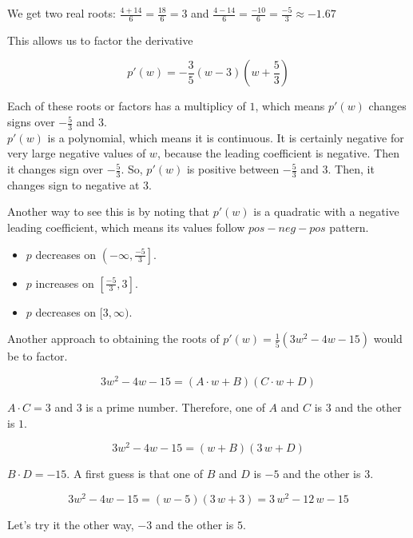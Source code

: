 \documentclass{ximera}
\begin{document}
We get two real roots: $\frac{4 + 14}{6} = \frac{18}{6} = 3$  and $\frac{4 - 14}{6} = \frac{-10}{6} = \frac{-5}{3} \approx -1.67$




This allows us to factor the derivative

\[
p'(w) = -\frac{3}{5}(w - 3) \left( w + \frac{5}{3} \right)
\]

Each of these roots or factors has a multiplicy of $1$, which means $p'(w)$ changes signs over $-\frac{5}{3}$ and $3$. \\


$p'(w)$ is a polynomial, which means it is continuous. It is certainly negative for very large negative values of $w$, because the leading coefficient is negative.  Then it changes sign over $-\frac{5}{3}$.  So, $p'(w)$ is positive between $-\frac{5}{3}$ and $3$.  Then, it changes sign to negative at $3$.


Another way to see this is by noting that $p'(w)$ is a quadratic with a negative leading coefficient, which means its values follow $pos - neg - pos$ pattern.


\begin{itemize}
\item $p$ decreases on $\left(-\infty, \frac{-5}{3}\right]$.
\item $p$ increases on $\left[\frac{-5}{3}, 3\right]$.
\item $p$ decreases on $[3, \infty)$.
\end{itemize}



Another approach to obtaining the roots of $p'(w) = \frac{1}{5}(3w^2 - 4w - 15)$ would be to factor. 


\[
3w^2 - 4w - 15      = (A \cdot w + B)(C \cdot w + D) 
\]

$A \cdot C = 3$ and $3$ is a prime number.  Therefore, one of $A$ and $C$ is $3$ and the other is $1$.



\[
3w^2 - 4w - 15      = (w + B)(3 \, w + D) 
\]



$B \cdot D = -15$.  A first guess is that one of $B$ and $D$ is $-5$ and the other is $3$. 


\[
3w^2 - 4w - 15      = (w - 5)(3 \, w + 3) = 3 \, w^2 -12 \, w - 15
\]



Let's try it the other way, $-3$ and the other is $5$.
\end{document}
